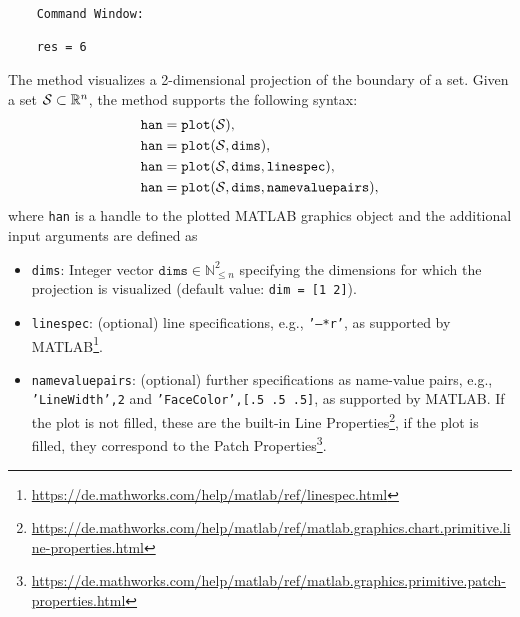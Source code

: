 \begin{center}
\begin{minipage}[t]{0.40\textwidth}
	\vspace{10pt}
	\footnotesize
	
\end{minipage}
\begin{minipage}[t]{0.2\textwidth}
	\vspace{10pt}

	\begin{verbatim}
	Command Window:
		
	res = 6
	\end{verbatim}
\end{minipage}
\begin{minipage}[t]{0.3\textwidth}
	\vspace{0pt}
	\centering
\end{minipage}
\end{center}



The method  visualizes a 2-dimensional projection of the boundary of a set. Given a set $\mathcal{S} \subset \mathbb{R}^n$, the method  supports the following syntax:
\begin{equation*}
	\begin{split}
		&\texttt{han} = {\normalfont \texttt{plot}}(\mathcal{S}), \\
		&\texttt{han} = {\normalfont \texttt{plot}}(\mathcal{S},\texttt{dims}), \\
		&\texttt{han} = {\normalfont \texttt{plot}}(\mathcal{S},\texttt{dims},\texttt{linespec}), \\
		&\texttt{han} = {\normalfont \texttt{plot}}(\mathcal{S},\texttt{dims},\texttt{namevaluepairs}), \\
	\end{split}
\end{equation*}
where \texttt{han} is a handle to the plotted MATLAB graphics object and the additional input arguments are defined as

\begin{itemize}
	\item \texttt{dims}: Integer vector $\texttt{dims} \in \mathbb{N}_{\leq n}^2$ specifying the dimensions for which the projection is visualized (default value: \texttt{dim = [1 2]}).
	\item \texttt{linespec}: (optional) line specifications, e.g., \texttt{'--*r'}, as supported by MATLAB\footnote{\url{https://de.mathworks.com/help/matlab/ref/linespec.html}}.
	\item \texttt{namevaluepairs}: (optional) further specifications as name-value pairs, e.g.,
	\texttt{'LineWidth',2} and \texttt{'FaceColor',[.5 .5 .5]}, as supported by MATLAB.
	If the plot is not filled, these are the built-in
	Line Properties\footnote{\url{https://de.mathworks.com/help/matlab/ref/matlab.graphics.chart.primitive.line-properties.html}},
	if the plot is filled, they correspond to the Patch Properties\footnote{\url{https://de.mathworks.com/help/matlab/ref/matlab.graphics.primitive.patch-properties.html}}.
\end{itemize}

